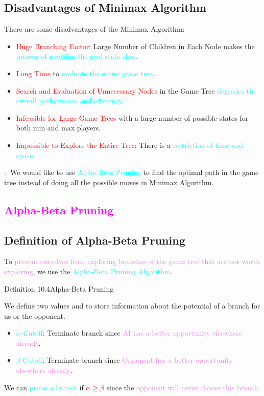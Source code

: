 \documentclass{book}
\begin{document}
\subsection{Disadvantages of Minimax Algorithm}
There are some disadvantages of the Minimax Algorithm:
\begin{itemize}
    \item \textcolor{red}{Huge Branching Factor}: Large Number of Children in Each Node makes the \textcolor{cyan}{process of reaching the goal state slow}.
    \item \textcolor{red}{Long Time} to \textcolor{cyan}{evaluate the entire game tree}.
    \item \textcolor{red}{Search and Evaluation of Unnecessary Nodes} in the Game Tree \textcolor{cyan}{degrades the overall performance and efficiency}.
    \item \textcolor{red}{Infeasible for Large Game Trees} with a large number of possible states for both min and max players.
    \item \textcolor{red}{Impossible to Explore the Entire Tree}: There is a \textcolor{cyan}{restriction of time and space}.
\end{itemize}
$\therefore$ We would like to use \textcolor{cyan}{Alpha-Beta Pruning} to find the optimal path in the game tree instead of doing all the possible moves in Minimax Algorithm.\\
\newpage
\textcolor{magenta}{\section{\textbf{Alpha-Beta Pruning}}}
\subsection{Definition of Alpha-Beta Pruning}
To \textcolor{violet}{prevent ourselves from exploring branches of the game tree that are not worth exploring}, we use the \textcolor{cyan}{Alpha-Beta Pruning Algorithm}.\\
\begin{defBox}{Definition 10.4}{Alpha-Beta Pruning}
    \raggedright
    We define two values \uuline{\textcolor{cyan}{Alpha ($\alpha$)} \textcolor{red}{= Best/Highest found so far along the  path for Max}} and \uuline{\textcolor{cyan}{Beta ($\beta$)} \textcolor{red}{= Best/Lowest found so far along the path for Min}} to store information about the potential of a branch for us or the opponent.\\
    \begin{itemize}
        \item \textcolor{cyan}{$\alpha$-Cutoff}: Terminate branch since \textcolor{violet}{AI has a better opportunity elsewhere already}.
        \item \textcolor{cyan}{$\beta$-Cutoff}: Terminate branch since \textcolor{violet}{Opponent has a better opportunity elsewhere already}.
    \end{itemize}
    We can \textcolor{cyan}{prune a branch} if \textcolor{red}{$\alpha \geq \beta$} since the \textcolor{violet}{opponent will never choose this branch}.\\
\end{defBox}
\end{document}
